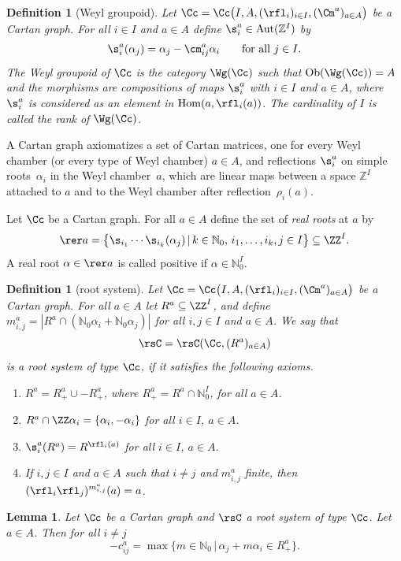 \documentclass[pdftex]{sigma}%
\numberwithin{equation}{section}
\newtheorem{lem}[teo]{Lemma}
\newtheorem{defin}[teo]{Definition}
\newcommand{\N}{\mathbb{N}}
\newcommand{\Z}{\mathbb{Z}}
\begin{document}
\begin{defin}[Weyl groupoid]
	Let $\Cc = \Cc \big(I,A,(\rfl _i)_{i \in I}, (\Cm ^a)_{a \in A}\big)$ be a
	Cartan graph. For all $i \in I$ and $a \in A$ define $\s _i^a \in
	\operatorname{Aut}(\Z ^I)$ by
	\begin{align*}
	\s _i^a (\alpha_j) = \alpha_j - \cm _{ij}^a \alpha_i \qquad
	\text{for all $j \in I$.}
	\end{align*}
	The \textit{Weyl groupoid of} $\Cc $
	is the category $\Wg (\Cc )$ such that $\operatorname{Ob} (\Wg (\Cc ))=A$ and
	the morphisms are compositions of maps
	$\s _i^a$ with $i\in I$ and $a\in A$,
	where $\s _i^a$ is considered as an element in $\operatorname{Hom} (a,\rfl _i(a))$.
	The cardinality of $I$ is called the \textit{rank of} $\Wg (\Cc )$.
\end{defin}
A Cartan graph axiomatizes a set of Cartan matrices, one for every Weyl chamber (or every type of Weyl chamber) $a\in A$, and reflections $\s_i^a$ on simple roots~$\alpha_i$ in the Weyl chamber~$a$, which are linear maps between a space $\Z^I$ attached to $a$ and to the Weyl chamber after reflection~$\rho_i(a)$.

Let $\Cc $ be a Cartan graph. For all $a\in A$ define the set of \emph{real roots} at $a$ by
\[ \rer a=\big\{ \s _{i_1}\cdots \s_{i_k}(\alpha_j)\,|\,
k\in \N _0,\,i_1,\dots,i_k,j\in I\big\}\subseteq \ZZ ^I.\]
A real root $\alpha\in \rer a$ is called positive if $\alpha\in \N _0^I$.

\begin{defin}[root system]
	Let $\Cc =\Cc \big(I,A,(\rfl _i)_{i\in I},(\Cm ^a)_{a\in A}\big)$ be a Cartan
	graph. For all $a\in A$ let $R^a\subseteq \ZZ ^I$, and define
	$m_{i,j}^a= |R^a \cap (\N_0 \alpha_i + \N_0 \alpha_j)|$ for all $i,j\in
	I$ and $a\in A$. We say that
	\[ \rsC = \rsC (\Cc, (R^a)_{a\in A}) \]
	is a \textit{root system of type} $\Cc $, if it satisfies the following
	axioms.
	\begin{enumerate}\itemsep=0pt
		\item[(R1)]
		$R^a=R^a_+\cup - R^a_+$, where $R^a_+=R^a\cap \N_0^I$, for all
		$a\in A$.
		\item[(R2)]
		$R^a\cap \ZZ\alpha_i=\{\alpha_i,-\alpha_i\}$ for all $i\in I$, $a\in A$.
		\item[(R3)]
		$\s _i^a(R^a) = R^{\rfl _i(a)}$ for all $i\in I$, $a\in A$.
		\item[(R4)]
		If $i,j\in I$ and $a\in A$ such that $i\not=j$ and $m_{i,j}^a$
		finite, then
		$(\rfl _i\rfl _j)^{m_{i,j}^a}(a)=a$.
	\end{enumerate}
\end{defin}
\begin{lem}
 Let $\Cc $ be a Cartan graph and $\rsC$ a root system of type $\Cc$. Let $a\in A$. Then for all $i\neq j$
 \[-c^a_{ij}=\max \big\{m\in\N_0\,|\,\alpha_j+m\alpha_i \in R^a_+\big\}.\]
\end{lem}
\end{document}
